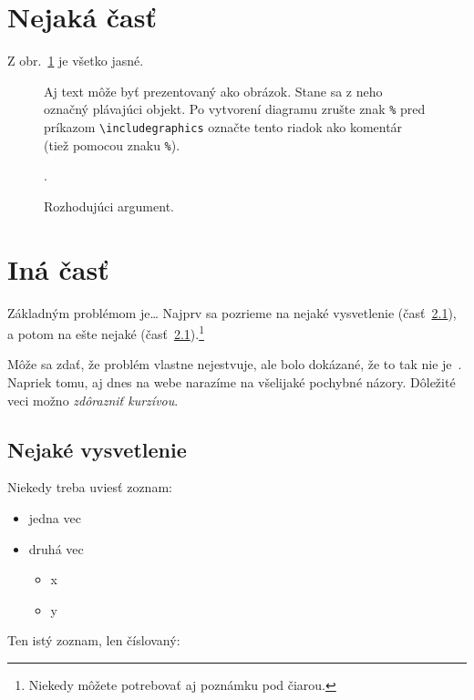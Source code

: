 \documentclass[10pt,twoside,english,a4paper]{article}
\begin{document}
\section{Nejaká časť} \label{nejaka}

Z obr.~\ref{f:rozhod} je všetko jasné. 

\begin{figure}[tbh]
\centering
Aj text môže byť prezentovaný ako obrázok. Stane sa z neho označný plávajúci objekt. Po vytvorení diagramu zrušte znak \texttt{\%} pred príkazom \verb|\includegraphics| označte tento riadok ako komentár (tiež pomocou znaku \texttt{\%}).

\cite{href}.

\caption{Rozhodujúci argument.}
\label{f:rozhod}
\end{figure}



\section{Iná časť} \label{ina}

Základným problémom je\ldots{} Najprv sa pozrieme na nejaké vysvetlenie (časť~\ref{ina:nejake}), a potom na ešte nejaké (časť~\ref{ina:nejake}).\footnote{Niekedy môžete potrebovať aj poznámku pod čiarou.}

Môže sa zdať, že problém vlastne nejestvuje\cite{Coplien:MPD}, ale bolo dokázané, že to tak nie je~\cite{Czarnecki:Staged, Czarnecki:Progress}. Napriek tomu, aj dnes na webe narazíme na všelijaké pochybné názory\cite{PLP-Framework}. Dôležité veci možno \emph{zdôrazniť kurzívou}.


\subsection{Nejaké vysvetlenie} \label{ina:nejake}

Niekedy treba uviesť zoznam:

\begin{itemize}
\item jedna vec
\item druhá vec
	\begin{itemize}
	\item x
	\item y
	\end{itemize}
\end{itemize}

Ten istý zoznam, len číslovaný:
\end{document}
